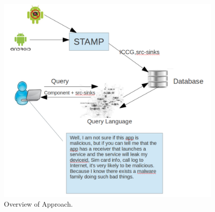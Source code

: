 \documentclass{sig-alternate}
\begin{document}
\begin{figure}
\begin{center}
  \includegraphics[scale=0.5]{img/overview}
\end{center}
\caption{Overview of Approach.}
\label{fig-ffsm}
\end{figure}
\end{document}
